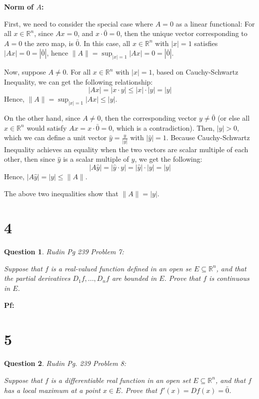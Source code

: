 \documentclass{article}
\newtheorem{question}{Question}
\begin{document}
\hfil

\textbf{Norm of $A$:}

First, we need to consider the special case where $A=0$ as a linear functional: For all $x\in\mathbb{R}^n$, since $Ax=0$, and $x\cdot \bar{0}=0$, then the unique vector corresponding to $A=0$ the zero map, is $\bar{0}$.
In this case, all $x\in\mathbb{R}^n$ with $|x|=1$ satisfies $|Ax|=0=|\bar{0}|$, hence $\|A\|=\sup_{|x|=1}|Ax|=0=|\bar{0}|$.

Now, suppose $A\neq 0$. For all $x\in\mathbb{R}^n$ with $|x|=1$, based on Cauchy-Schwartz Inequality, we can get the following relationship:
$$|Ax| = |x\cdot y|\leq |x|\cdot |y|=|y|$$
Hence, $\|A\|=\sup_{|x|=1}|Ax|\leq |y|$.

On the other hand, since $A\neq 0$, then the corresponding vector $y\neq\bar{0}$ (or else all $x\in\mathbb{R}^n$ would satisfy $Ax = x\cdot \bar{0}=0$, which is a contradiction). Then, $|y|>0$, which we can define a unit vector $\hat{y}=\frac{y}{|y|}$ with $|\hat{y}|=1$.
Because Cauchy-Schwartz Inequality achieves an equality when the two vectors are scalar multiple of each other, then since $\hat{y}$ is a scalar multiple of $y$, we get the following:
$$|A\hat{ y}|=|\hat{y}\cdot y| = |\hat{y}|\cdot |y|=|y|$$
Hence, $|A\hat{y}|=|y|\leq \|A\|$.

The above two inequalities show that $\|A\|=|y|$.

\break

\section*{4}
\begin{myBox}[]{}
    \begin{question}
        Rudin Pg 239 Problem 7:

        Suppose that $f$ is a real-valued function defined in an open se $E\subseteq \mathbb{R}^n$, and that the partial derivatives $D_1f, ..., D_nf$ are bounded in $E$.
        Prove that $f$ is continuous in $E$.
    \end{question}
\end{myBox}

\textbf{Pf:}

\break

\section*{5}
\begin{myBox}[]{}
    \begin{question}
        Rudin Pg. 239 Problem 8:

        Suppose that $f$ is a differentiable real function in an open set $E\subseteq \mathbb{R}^n$, 
        and that $f$ has a local maximum at a point $x\in E$. Prove that $f'(x)=Df(x)=\bar{0}$.
    \end{question}
\end{myBox}
\end{document}
